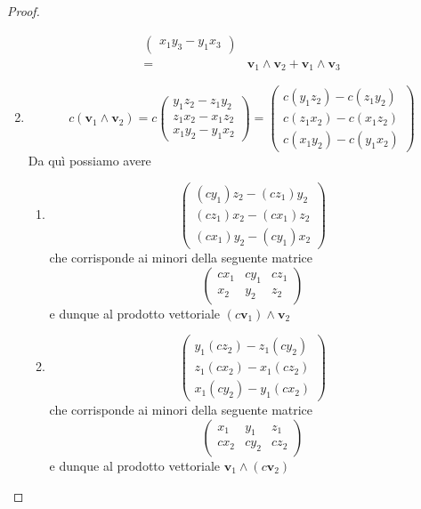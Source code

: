 \documentclass{article}
\theoremstyle{plain}
\theoremstyle{definition}
\theoremstyle{remark}
\begin{document}
\begin{proof}
\begin{enumerate}
\begin{align*}
\begin{pmatrix}
    x_1y_3 -y_1x_3
    \end{pmatrix}\\
    =&\mathbf{v}_1 \wedge \mathbf{v}_2 + \mathbf{v}_1 \wedge \mathbf{v}_3
    \end{align*}
    \item \[c(\mathbf{v}_1 \wedge \mathbf{v}_2) =
        c\begin{pmatrix}
        y_1 z_2 - z_1 y_2\\
        z_1 x_2 - x_1 z_2\\
        x_1 y_2 - y_1 x_2    
        \end{pmatrix}=
        \begin{pmatrix}
        c (y_1 z_2) - c (z_1 y_2)\\
        c (z_1 x_2) - c (x_1 z_2)\\
        c (x_1 y_2) - c (y_1 x_2)    
        \end{pmatrix}\]
        Da quì possiamo avere 
        \begin{enumerate}
            \item 
            \[\begin{pmatrix}
             (cy_1) z_2 - (cz_1) y_2\\
             (cz_1) x_2 - (cx_1) z_2\\
             (cx_1) y_2 - (cy_1) x_2    
            \end{pmatrix}\] che corrisponde ai minori della seguente matrice
            \[
            \begin{pmatrix}
            cx_1 & cy_1 & cz_1\\
            x_2 & y_2 & z_2
            \end{pmatrix}
            \]
            e dunque al prodotto vettoriale $(c\mathbf{v}_1) \wedge \mathbf{v}_2$
            \item 
            \[\begin{pmatrix}
             y_1 (cz_2) -  z_1 (cy_2)\\
             z_1 (cx_2) -  x_1 (cz_2)\\
             x_1 (cy_2) -  y_1 (cx_2)    
            \end{pmatrix}\]che corrisponde ai minori della seguente matrice
            \[
            \begin{pmatrix}
            x_1 & y_1 & z_1\\
            cx_2 & cy_2 & cz_2
            \end{pmatrix}
            \]
            e dunque al prodotto vettoriale $\mathbf{v}_1 \wedge (c\mathbf{v}_2)$

\end{enumerate}
\end{enumerate}
\end{proof}
\end{document}
